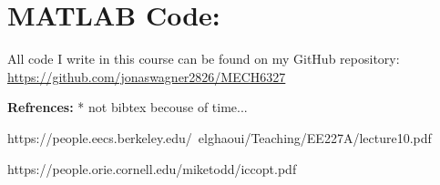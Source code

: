 \documentclass[letter]{article}
\begin{document}
\newpage
\appendix
\section{MATLAB Code:}\label{apx:matlab}
All code I write in this course can be found on my GitHub repository:\\
\href{https://github.com/jonaswagner2826/MECH6337}{https://github.com/jonaswagner2826/MECH6327}




\newpage
\textbf{Refrences:} * not bibtex becouse of time...

https://people.eecs.berkeley.edu/~elghaoui/Teaching/EE227A/lecture10.pdf

https://people.orie.cornell.edu/miketodd/iccopt.pdf
\end{document}
